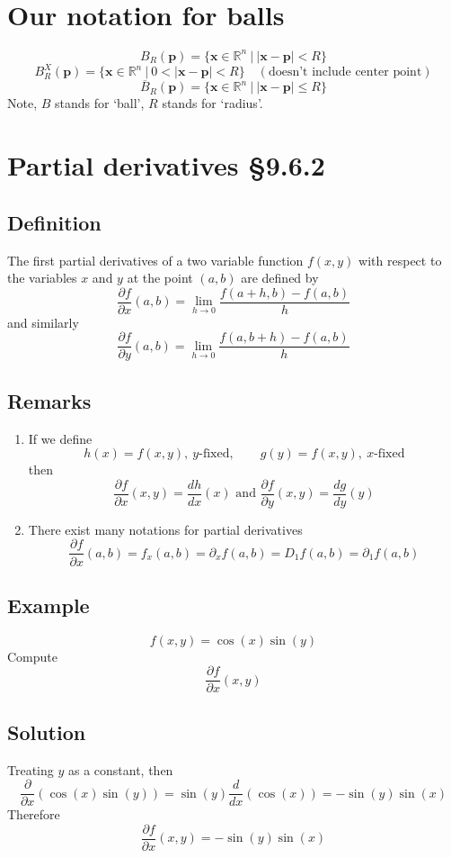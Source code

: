\documentclass[11pt]{article}
\newcommand{\reals}{\mathbb{R}}
\renewcommand{\vec}[1]{\mathbf{#1}}
\begin{document}
\section{Our notation for balls}
\[ B_R(\vec{p}) = \{ \vec{x} \in \reals^n\ |\ |\vec{x} - \vec{p}| < R \} \]
\[ B_R^X(\vec{p}) = \{ \vec{x} \in \reals^n\ |\ 0 < |\vec{x} - \vec{p}| < R \} \quad (\text{doesn't include center point}) \]
\[ \overline{B}_R(\vec{p}) = \{ \vec{x} \in \reals^n\ |\ |\vec{x} - \vec{p}| \leq R \} \]
Note, $B$ stands for `ball', $R$ stands for `radius'.

\section{Partial derivatives §9.6.2}
\subsection{Definition}
The first partial derivatives of a two variable function $f(x, y)$ with respect to the variables $x$ and $y$ at the point $(a, b)$ are defined by
\[ \frac{\partial f}{\partial x}(a, b) = \lim_{h \rightarrow 0} \frac{f(a + h, b) - f(a, b)}{h} \]
and similarly
\[ \frac{\partial f}{\partial y}(a, b) = \lim_{h \rightarrow 0} \frac{f(a, b + h) - f(a, b)}{h} \]

\subsection{Remarks}
\begin{enumerate}[ (i) ]
\item If we define 
\[ h(x) = f(x, y),\ y\text{-fixed}, \quad \quad g(y) = f(x, y),\ x\text{-fixed} \]
then
\[ \frac{\partial f}{\partial x}(x, y) = \frac{dh}{dx}(x) \text{ and } \frac{\partial f}{\partial y}(x, y) = \frac{dg}{dy}(y) \]

\item There exist many notations for partial derivatives
\[ \frac{\partial f}{\partial x}(a, b) = f_x(a, b) = \partial_x f(a, b) = D_1 f(a, b) = \partial_1 f(a, b) \]
\end{enumerate}

\subsection{Example}
\[ f(x, y) = \cos(x) \sin(y) \]
Compute
\[ \frac{\partial f}{\partial x} (x, y) \]

\subsection{Solution}
Treating $y$ as a constant, then
\[ \frac{\partial}{\partial x}(\cos(x) \sin(y)) = \sin(y) \frac{d}{dx}(\cos(x)) = -\sin(y) \sin(x) \]
Therefore
\[ \frac{\partial f}{\partial x}(x, y) = -\sin(y) \sin(x) \]
\end{document}
